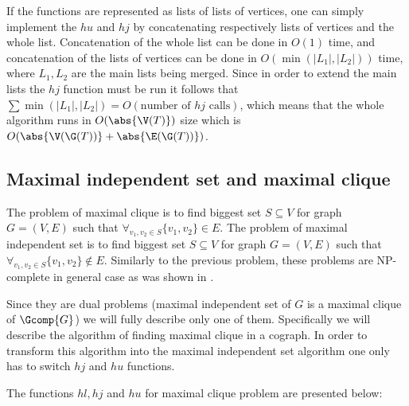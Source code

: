 If the functions are represented as lists of lists of vertices, one can simply implement the $hu$ and $hj$ by concatenating respectively lists of vertices and the whole list. Concatenation of the whole list can be done in $O(1)$ time, and concatenation of the lists of vertices can be done in $O(\min(|L_1|, |L_2|))$ time, where $L_1, L_2$ are the main lists being merged. Since in order to extend the main lists the $hj$ function must be run it follows that $\sum \min(|L_1|, |L_2|) = O(\text{number of $hj$ calls})$, which means that the whole algorithm runs in $O(\abs{\V(T)})$ size which is $O(\abs{\V(\G(T))} + \abs{\E(\G(T))})$.

\subsection{Maximal independent set and maximal clique}

The problem of maximal clique is to find biggest set $S \subseteq V$ for graph $G = (V,E)$ such that $\forall_{v_1, v_2 \in S} \{v_1, v_2\} \in E$. The problem of maximal independent set is to find biggest set $S \subseteq V$ for graph $G = (V,E)$ such that $\forall_{v_1, v_2 \in S} \{v_1, v_2\} \not\in E$. Similarly to the previous problem, these problems are NP-complete in general case as was shown in \cite{karp}.

Since they are dual problems (maximal independent set of $G$ is a maximal clique of $\Gcomp{G}$) we will fully describe only one of them. Specifically we will describe the algorithm of finding maximal clique in a cograph. In order to transform this algorithm into the maximal independent set algorithm one only has to switch $hj$ and $hu$ functions.

The functions $hl, hj$ and $hu$ for maximal clique problem are presented below:

